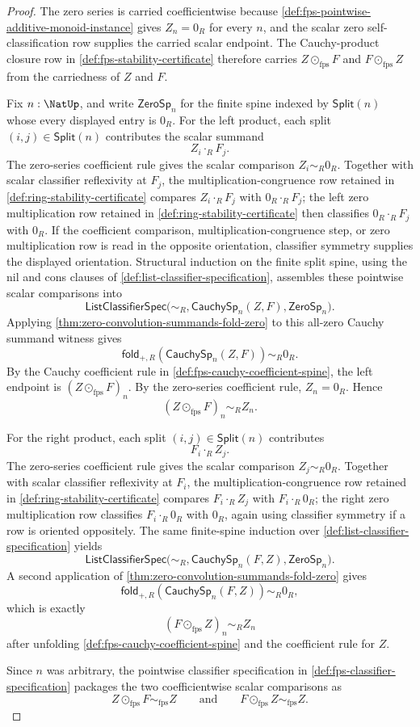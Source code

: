 \begin{proof}
The zero series is carried coefficientwise because \autoref{def:fps-pointwise-additive-monoid-instance} gives $Z_n=0_R$ for every $n$, and the scalar zero self-classification row supplies the carried scalar endpoint. The Cauchy-product closure row in \autoref{def:fps-stability-certificate} therefore carries $Z\odot_{\mathrm{fps}}F$ and $F\odot_{\mathrm{fps}}Z$ from the carriedness of $Z$ and $F$.

Fix $n:\NatUp$, and write $\mathsf{ZeroSp}_n$ for the finite spine indexed by $\mathsf{Split}(n)$ whose every displayed entry is $0_R$. For the left product, each split $(i,j)\in\mathsf{Split}(n)$ contributes the scalar summand
$$
Z_i\cdot_R F_j.
$$
The zero-series coefficient rule gives the scalar comparison $Z_i\sim_R0_R$. Together with scalar classifier reflexivity at $F_j$, the multiplication-congruence row retained in \autoref{def:ring-stability-certificate} compares $Z_i\cdot_R F_j$ with $0_R\cdot_R F_j$; the left zero multiplication row retained in \autoref{def:ring-stability-certificate} then classifies $0_R\cdot_R F_j$ with $0_R$. If the coefficient comparison, multiplication-congruence step, or zero multiplication row is read in the opposite orientation, classifier symmetry supplies the displayed orientation. Structural induction on the finite split spine, using the nil and cons clauses of \autoref{def:list-classifier-specification}, assembles these pointwise scalar comparisons into
$$
\mathsf{ListClassifierSpec}\bigl(\sim_R,\mathsf{CauchySp}_n(Z,F),\mathsf{ZeroSp}_n\bigr).
$$
Applying \autoref{thm:zero-convolution-summands-fold-zero} to this all-zero Cauchy summand witness gives
$$
\mathsf{fold}_{+,R}(\mathsf{CauchySp}_n(Z,F))\sim_R0_R.
$$
By the Cauchy coefficient rule in \autoref{def:fps-cauchy-coefficient-spine}, the left endpoint is $(Z\odot_{\mathrm{fps}}F)_n$. By the zero-series coefficient rule, $Z_n=0_R$. Hence
$$
(Z\odot_{\mathrm{fps}}F)_n\sim_RZ_n.
$$

For the right product, each split $(i,j)\in\mathsf{Split}(n)$ contributes
$$
F_i\cdot_R Z_j.
$$
The zero-series coefficient rule gives the scalar comparison $Z_j\sim_R0_R$. Together with scalar classifier reflexivity at $F_i$, the multiplication-congruence row retained in \autoref{def:ring-stability-certificate} compares $F_i\cdot_R Z_j$ with $F_i\cdot_R0_R$; the right zero multiplication row classifies $F_i\cdot_R0_R$ with $0_R$, again using classifier symmetry if a row is oriented oppositely. The same finite-spine induction over \autoref{def:list-classifier-specification} yields
$$
\mathsf{ListClassifierSpec}\bigl(\sim_R,\mathsf{CauchySp}_n(F,Z),\mathsf{ZeroSp}_n\bigr).
$$
A second application of \autoref{thm:zero-convolution-summands-fold-zero} gives
$$
\mathsf{fold}_{+,R}(\mathsf{CauchySp}_n(F,Z))\sim_R0_R,
$$
which is exactly
$$
(F\odot_{\mathrm{fps}}Z)_n\sim_RZ_n
$$
after unfolding \autoref{def:fps-cauchy-coefficient-spine} and the coefficient rule for $Z$.

Since $n$ was arbitrary, the pointwise classifier specification in \autoref{def:fps-classifier-specification} packages the two coefficientwise scalar comparisons as
$$
Z\odot_{\mathrm{fps}}F\sim_{\mathrm{fps}}Z
\qquad\text{and}\qquad
F\odot_{\mathrm{fps}}Z\sim_{\mathrm{fps}}Z.
$$
\end{proof}
